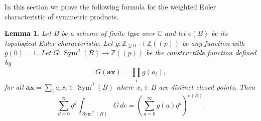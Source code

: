 \documentclass[12pt]{amsart}
\newtheorem{lemma}[theorem]{Lemma}
\theoremstyle{definition}
\newcommand{\CC} {\mathbb{C}}          %
\newcommand{\ZZ} {\mathbb{Z}}		%
\newcommand{\Sym}{\operatorname{Sym}}
\newcommand{\boldx}{\boldsymbol{x}}
\newcommand{\bolda}{\boldsymbol{a}}
\begin{document}
In this section we prove the following formula for the weighted Euler
characteristic of symmetric products.

\begin{lemma}\label{lem: formula for euler char of sym products}
Let $B$ be a scheme of finite type over $\CC $ and let $e (B)$ be its
topological Euler characteristic. Let $g:\ZZ _{\geq 0}\to \ZZ
(\!(p)\!)$ be any function with $g (0)=1$. Let $G:\Sym ^{d} (B)\to \ZZ
(\!(p)\!)$ be the constructible function defined by
\[
G (\bolda \boldx )=\prod _{i}g (a_{i}),
\]
for all $\bolda \boldx  = \sum_{i}
a_{i}x_{i} \in \Sym^d(B)$ where $x_i \in B$ are distinct closed points. Then
\[
\sum _{d=0}^{\infty } q^{d} \int _{\Sym ^{d} (B)} G \, de =
\left(\sum _{a=0}^{\infty }g (a) q^{a} \right)^{e (B)}.
\]
\end{lemma}
\end{document}
